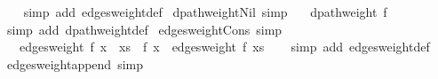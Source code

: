\begin{isabellebody}
\endisataginvisible
{\isafoldinvisible}%
%
\isadeliminvisible
\isanewline
%
\endisadeliminvisible
%
\isadelimproof
\ \ %
\endisadelimproof
%
\isatagproof
{}\isamarkupfalse%
\ {\isacharparenleft}{\kern0pt}simp\ add{\isacharcolon}{\kern0pt}\ edges{\isacharunderscore}{\kern0pt}weight{\isacharunderscore}{\kern0pt}def{\isacharparenright}{\kern0pt}%
\endisatagproof
{\isafoldproof}%
%
\isadelimproof
\isanewline
%
\endisadelimproof
%
\isadeliminvisible
\isanewline
%
\endisadeliminvisible
%
\isataginvisible
{}\isamarkupfalse%
\ dpath{\isacharunderscore}{\kern0pt}weight{\isacharunderscore}{\kern0pt}Nil\ {\isacharbrackleft}{\kern0pt}simp{\isacharbrackright}{\kern0pt}{\isacharcolon}{\kern0pt}\isanewline
\ \ \ {\isachardoublequoteopen}dpath{\isacharunderscore}{\kern0pt}weight\ f\ {\isacharbrackleft}{\kern0pt}{\isacharbrackright}{\kern0pt}\ {\isacharequal}{\kern0pt}\ {}{\isachardoublequoteclose}%
\endisataginvisible
{\isafoldinvisible}%
%
\isadeliminvisible
\isanewline
%
\endisadeliminvisible
%
\isadelimproof
\ \ %
\endisadelimproof
%
\isatagproof
{}\isamarkupfalse%
\ {\isacharparenleft}{\kern0pt}simp\ add{\isacharcolon}{\kern0pt}\ dpath{\isacharunderscore}{\kern0pt}weight{\isacharunderscore}{\kern0pt}def{\isacharparenright}{\kern0pt}%
\endisatagproof
{\isafoldproof}%
%
\isadelimproof
\isanewline
%
\endisadelimproof
%
\isadeliminvisible
\isanewline
%
\endisadeliminvisible
%
\isataginvisible
{}\isamarkupfalse%
\ edges{\isacharunderscore}{\kern0pt}weight{\isacharunderscore}{\kern0pt}Cons\ {\isacharbrackleft}{\kern0pt}simp{\isacharbrackright}{\kern0pt}{\isacharcolon}{\kern0pt}\isanewline
\ \ \ {\isachardoublequoteopen}edges{\isacharunderscore}{\kern0pt}weight\ f\ {\isacharparenleft}{\kern0pt}x\ {\isacharhash}{\kern0pt}\ xs{\isacharparenright}{\kern0pt}\ {\isacharequal}{\kern0pt}\ f\ x\ {\isacharplus}{\kern0pt}\ edges{\isacharunderscore}{\kern0pt}weight\ f\ xs{\isachardoublequoteclose}%
\endisataginvisible
{\isafoldinvisible}%
%
\isadeliminvisible
\isanewline
%
\endisadeliminvisible
%
\isadelimproof
\ \ %
\endisadelimproof
%
\isatagproof
{}\isamarkupfalse%
\ {\isacharparenleft}{\kern0pt}simp\ add{\isacharcolon}{\kern0pt}\ edges{\isacharunderscore}{\kern0pt}weight{\isacharunderscore}{\kern0pt}def{\isacharparenright}{\kern0pt}%
\endisatagproof
{\isafoldproof}%
%
\isadelimproof
\isanewline
%
\endisadelimproof
%
\isadeliminvisible
\isanewline
%
\endisadeliminvisible
%
\isataginvisible
{}\isamarkupfalse%
\ edges{\isacharunderscore}{\kern0pt}weight{\isacharunderscore}{\kern0pt}append\ {\isacharbrackleft}{\kern0pt}simp{\isacharbrackright}{\kern0pt}{\isacharcolon}{\kern0pt}\isanewline

\end{isabellebody}
